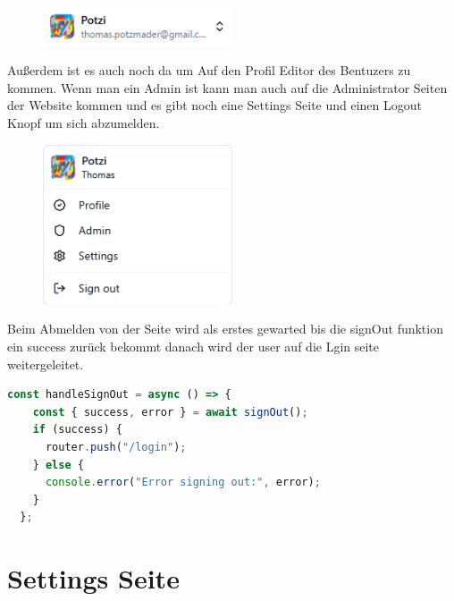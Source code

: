 \begin{inhalt}
\begin{enumerate}[label=\textbf{\arabic*.}]
\begin{figure}[!htb]
\centering
\includegraphics[width=0.5\textwidth]{files/Thomas/pics/Website/Sidebar/nav-user/user-component.png}
\caption[Bildbezeichnung für Abbildungsverzeichnis]{}
\label{fig:gehaeuse_internet_bild}
\end{figure}

\clearpage

Außerdem ist es auch noch da um Auf den Profil Editor des Bentuzers zu kommen. Wenn man ein Admin ist kann man auch auf die Administrator Seiten der Website kommen und es gibt noch eine Settings Seite und einen Logout Knopf um sich abzumelden. 

\begin{figure}[!htb]
\centering
\includegraphics[width=0.5\textwidth]{files/Thomas/pics/Website/Sidebar/nav-user/user-component-open.png}
\caption[Bildbezeichnung für Abbildungsverzeichnis]{}
\label{fig:gehaeuse_internet_bild}
\end{figure}



Beim Abmelden von der Seite wird als erstes  gewarted bis die signOut funktion ein success zurück bekommt danach wird der user auf die Lgin seite weitergeleitet. 

\begin{lstlisting}[language=TypeScript]
  const handleSignOut = async () => {
    const { success, error } = await signOut();
    if (success) {
      router.push("/login");
    } else {
      console.error("Error signing out:", error);
    }
  };
\end{lstlisting}


\newpage

\section{Settings Seite}


\end{enumerate}
\end{inhalt}
